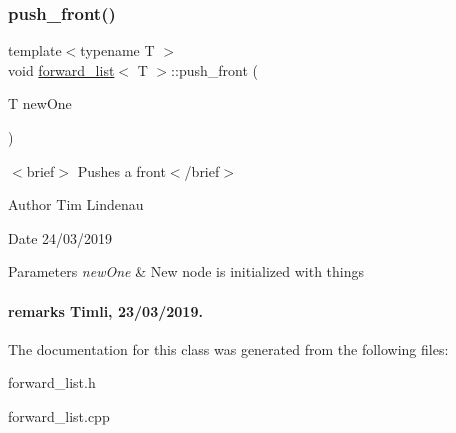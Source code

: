 \subsubsection{\texorpdfstring{push\_front()}{push\_front()}}
{\footnotesize\ttfamily template$<$typename T $>$ \\
void \mbox{\hyperlink{classforward__list}{forward\+\_\+list}}$<$ T $>$\+::push\+\_\+front (\begin{DoxyParamCaption}\item[{T}]{new\+One }\end{DoxyParamCaption})}

$<$brief$>$ Pushes a front$<$/brief$>$

\begin{DoxyAuthor}{Author}
Tim Lindenau 
\end{DoxyAuthor}
\begin{DoxyDate}{Date}
24/03/2019
\end{DoxyDate}

\begin{DoxyParams}{Parameters}
{\em new\+One} & New node is initialized with things\\
\hline
\end{DoxyParams}
\paragraph*{remarks Timli, 23/03/2019.}

The documentation for this class was generated from the following files\+:\begin{DoxyCompactItemize}
\item 
forward\+\_\+list.\+h\item 
forward\+\_\+list.\+cpp\end{DoxyCompactItemize}

